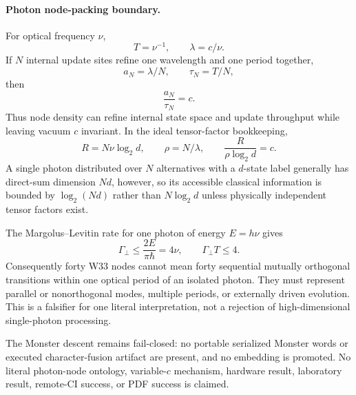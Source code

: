 \paragraph{Photon node-packing boundary.}
For optical frequency $\nu$,
\[
T=\nu^{-1},\qquad \lambda=c/\nu.
\]
If $N$ internal update sites refine one wavelength and one period together,
\[
a_N=\lambda/N,\qquad \tau_N=T/N,
\]
then
\[
\boxed{\frac{a_N}{\tau_N}=c.}
\]
Thus node density can refine internal state space and update throughput while leaving vacuum $c$ invariant.  In the ideal tensor-factor bookkeeping,
\[
R=N\nu\log_2d,\qquad \rho=N/\lambda,
\qquad
\frac{R}{\rho\log_2d}=c.
\]
A single photon distributed over $N$ alternatives with a $d$-state label generally has direct-sum dimension $Nd$, however, so its accessible classical information is bounded by $\log_2(Nd)$ rather than $N\log_2d$ unless physically independent tensor factors exist.

The Margolus--Levitin rate for one photon of energy $E=h\nu$ gives
\[
\Gamma_\perp\le\frac{2E}{\pi\hbar}=4\nu,
\qquad
\Gamma_\perp T\le4.
\]
Consequently forty W33 nodes cannot mean forty sequential mutually orthogonal transitions within one optical period of an isolated photon.  They must represent parallel or nonorthogonal modes, multiple periods, or externally driven evolution.  This is a falsifier for one literal interpretation, not a rejection of high-dimensional single-photon processing.

The Monster descent remains fail-closed: no portable serialized Monster words or executed character-fusion artifact are present, and no embedding is promoted.  No literal photon-node ontology, variable-$c$ mechanism, hardware result, laboratory result, remote-CI success, or PDF success is claimed.
